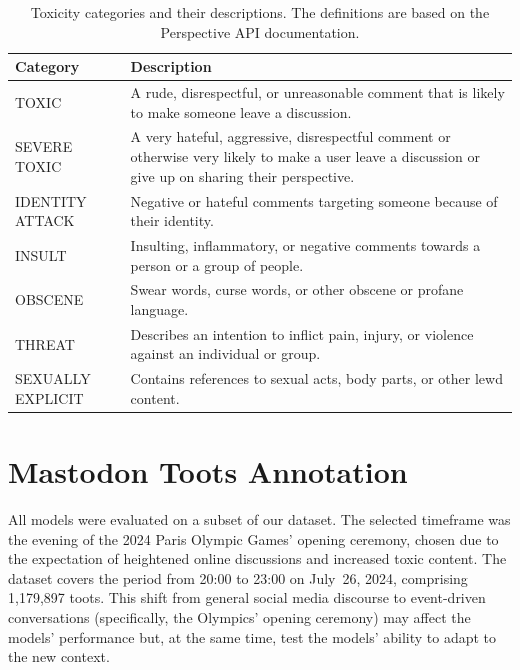 \begin{table}[tb]
    \centering\small
    \renewcommand{\arraystretch}{1.3}
    \begin{tabularx}{\textwidth}{lX}
        \toprule
        \textbf{Category} & \textbf{Description} \\
        \midrule
        TOXIC & A rude, disrespectful, or unreasonable comment that is likely to make someone leave a discussion. \\
        SEVERE TOXIC & A very hateful, aggressive, disrespectful comment or otherwise very likely to make a user leave a discussion or give up on sharing their perspective. \\
        IDENTITY ATTACK & Negative or hateful comments targeting someone because of their identity. \\
        INSULT & Insulting, inflammatory, or negative comments towards a person or a group of people. \\
        OBSCENE & Swear words, curse words, or other obscene or profane language. \\
        THREAT & Describes an intention to inflict pain, injury, or violence against an individual or group. \\
        SEXUALLY EXPLICIT & Contains references to sexual acts, body parts, or other lewd content. \\
        \bottomrule
    \end{tabularx}
    \caption[perspectiveapi]{Toxicity categories and their descriptions. The definitions are based on the Perspective API documentation\footnotemark.}
    \label{toxicity-categories}
\end{table}

\section{Mastodon Toots Annotation} \label{annotation}
All models were evaluated on a subset of our dataset. The selected timeframe was the evening of the 2024 Paris Olympic Games' opening ceremony, chosen due to the expectation of heightened online discussions and increased toxic content. The dataset covers the period from 20:00 to 23:00 on July~26, 2024, comprising 1,179,897 toots. This shift from general social media discourse to event-driven conversations (specifically, the Olympics' opening ceremony) may affect the models' performance but, at the same time, test the models' ability to adapt to the new context.

